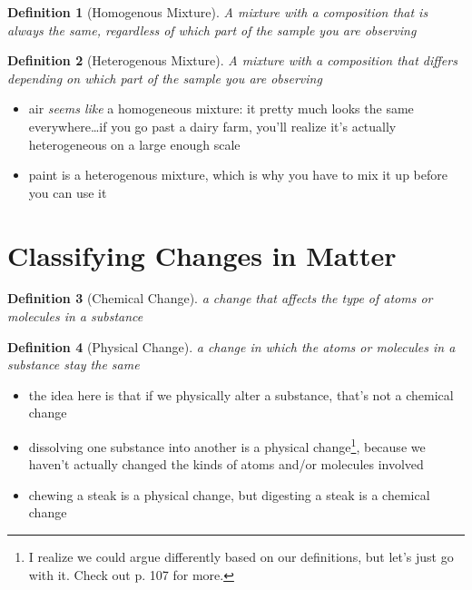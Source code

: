 \documentclass[11pt, oneside]{article}   	%
\newtheorem{definition}{Definition}
\begin{document}
\begin{definition}[Homogenous Mixture]\label{defn:mixture:homo}
A mixture with a composition that is always the same, regardless of which part of the sample you are observing
\end{definition}

\begin{definition}[Heterogenous Mixture]\label{defn:mixture:hetero}
A mixture with a composition that differs depending on which part of the sample you are observing
\end{definition}

\begin{itemize}
\item air \emph{seems like} a homogeneous mixture: it pretty much looks the same everywhere\ldots if you go past a dairy farm, you'll realize it's actually heterogeneous on a large enough scale
\item paint is a heterogenous mixture, which is why you have to mix it up before you can use it
\end{itemize}

\section{Classifying Changes in Matter}

\begin{definition}[Chemical Change]\label{defn:change-chemical}
a change that affects the type of atoms or molecules in a substance
\end{definition}

\begin{definition}[Physical Change]\label{defn:change-physical}
a change in which the atoms or molecules in a substance stay the same
\end{definition}

\begin{itemize}
\item the idea here is that if we physically alter a substance, that's not a chemical change
\item dissolving one substance into another is a physical change\footnote{I realize we could argue differently based on our definitions, but let's just go with it. Check out p. 107 for more.}, because we haven't actually changed the kinds of atoms and/or molecules involved
\item chewing a steak is a physical change, but digesting a steak is a chemical change
\end{itemize}
\end{document}

